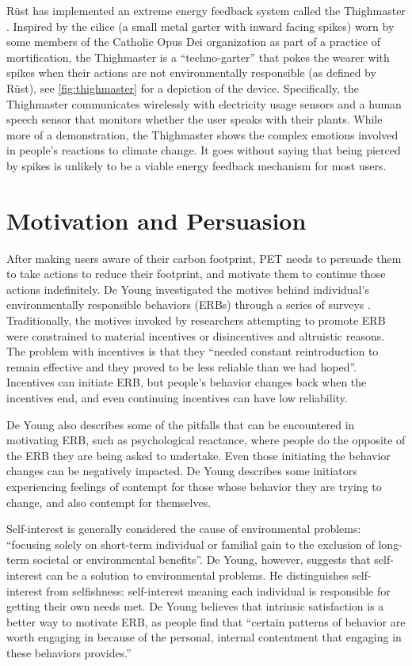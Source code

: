 R\"{u}st has implemented an extreme energy feedback system called the Thighmaster \cite{Rust2008Thighmaster-web}. Inspired by the cilice (a small metal garter with inward facing spikes) worn by some members of the Catholic Opus Dei organization as part of a practice of mortification, the Thighmaster is a ``techno-garter'' that pokes the wearer with spikes when their actions are not environmentally responsible (as defined by R\"{u}st), see \autoref{fig:thighmaster} for a depiction of the device. Specifically, the Thighmaster communicates wirelessly with electricity usage sensors and a human speech sensor that monitors whether the user speaks with their plants. While more of a demonstration, the Thighmaster shows the complex emotions involved in people's reactions to climate change. It goes without saying that being pierced by spikes is unlikely to be a viable energy feedback mechanism for most users.


\section{Motivation and Persuasion}

After making users aware of their carbon footprint, PET needs to persuade them to take actions to reduce their footprint, and motivate them to continue those actions indefinitely. De Young investigated the motives behind individual's environmentally responsible behaviors (ERBs) through a series of surveys \cite{Young:2000fv}. Traditionally, the motives invoked by researchers attempting to promote ERB were constrained to material incentives or disincentives and altruistic reasons. The problem with incentives is that they ``needed constant reintroduction to remain effective and they proved to be less reliable than we had hoped''. Incentives can initiate ERB, but people's behavior changes back when the incentives end, and even continuing incentives can have low reliability.

De Young also describes some of the pitfalls that can be encountered in motivating ERB, such as psychological reactance, where people do the opposite of the ERB they are being asked to undertake. Even those initiating the behavior changes can be negatively impacted. De Young describes some initiators experiencing feelings of contempt for those whose behavior they are trying to change, and also contempt for themselves.

Self-interest is generally considered the cause of environmental problems: ``focusing solely on short-term individual or familial gain to the exclusion of long-term societal or environmental benefits''. De Young, however, suggests that self-interest can be a solution to environmental problems. He distinguishes self-interest from selfishness: self-interest meaning each individual is responsible for getting their own needs met. De Young believes that intrinsic satisfaction is a better way to motivate ERB, as people find that ``certain patterns of behavior are worth engaging in because of the personal, internal contentment that engaging in these behaviors provides.''

